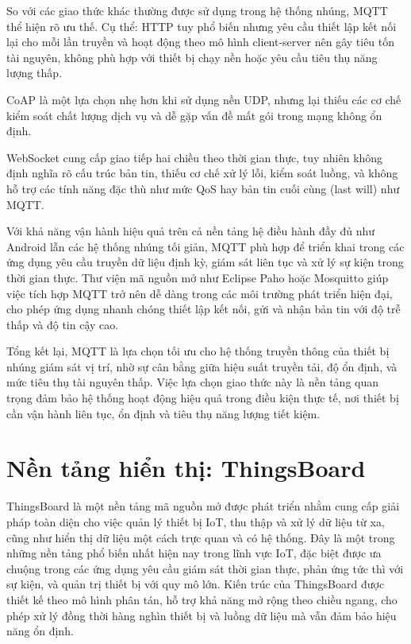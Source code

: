 \documentclass[../DoAn.tex]{subfiles}
\begin{document}
So với các giao thức khác thường được sử dụng trong hệ thống nhúng, MQTT thể hiện rõ ưu thế. Cụ thể: 
HTTP tuy phổ biến nhưng yêu cầu thiết lập kết nối lại cho mỗi lần truyền và hoạt động theo mô hình client-server nên gây tiêu tốn tài nguyên, không phù hợp với thiết bị chạy nền hoặc yêu cầu tiêu thụ năng lượng thấp. 

CoAP là một lựa chọn nhẹ hơn khi sử dụng nền UDP, nhưng lại thiếu các cơ chế kiểm soát chất lượng dịch vụ và dễ gặp vấn đề mất gói trong mạng không ổn định. 

WebSocket cung cấp giao tiếp hai chiều theo thời gian thực, tuy nhiên không định nghĩa rõ cấu trúc bản tin, thiếu cơ chế xử lý lỗi, kiểm soát luồng, và không hỗ trợ các tính năng đặc thù như mức QoS hay bản tin cuối cùng (last will) như MQTT.

Với khả năng vận hành hiệu quả trên cả nền tảng hệ điều hành đầy đủ như Android lẫn các hệ thống nhúng tối giản, MQTT phù hợp để triển khai trong các ứng dụng yêu cầu truyền dữ liệu định kỳ, giám sát liên tục và xử lý sự kiện trong thời gian thực. Thư viện mã nguồn mở như Eclipse Paho hoặc Mosquitto giúp việc tích hợp MQTT trở nên dễ dàng trong các môi trường phát triển hiện đại, cho phép ứng dụng nhanh chóng thiết lập kết nối, gửi và nhận bản tin với độ trễ thấp và độ tin cậy cao.

Tổng kết lại, MQTT là lựa chọn tối ưu cho hệ thống truyền thông của thiết bị nhúng giám sát vị trí, nhờ sự cân bằng giữa hiệu suất truyền tải, độ ổn định, và mức tiêu thụ tài nguyên thấp. Việc lựa chọn giao thức này là nền tảng quan trọng đảm bảo hệ thống hoạt động hiệu quả trong điều kiện thực tế, nơi thiết bị cần vận hành liên tục, ổn định và tiêu thụ năng lượng tiết kiệm.

\section{Nền tảng hiển thị: ThingsBoard}
\label{section:3.4}
ThingsBoard là một nền tảng mã nguồn mở được phát triển nhằm cung cấp giải pháp toàn diện cho việc quản lý thiết bị IoT, thu thập và xử lý dữ liệu từ xa, cũng như hiển thị dữ liệu một cách trực quan và có hệ thống. Đây là một trong những nền tảng phổ biến nhất hiện nay trong lĩnh vực IoT, đặc biệt được ưa chuộng trong các ứng dụng yêu cầu giám sát thời gian thực, phản ứng tức thì với sự kiện, và quản trị thiết bị với quy mô lớn. Kiến trúc của ThingsBoard được thiết kế theo mô hình phân tán, hỗ trợ khả năng mở rộng theo chiều ngang, cho phép xử lý đồng thời hàng nghìn thiết bị và luồng dữ liệu mà vẫn đảm bảo hiệu năng ổn định.
\end{document}
